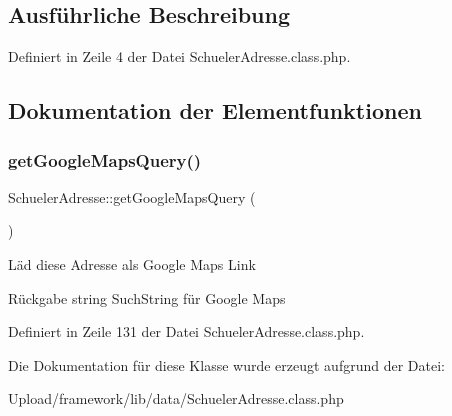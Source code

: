 \subsection{Ausführliche Beschreibung}


Definiert in Zeile 4 der Datei Schueler\+Adresse.\+class.\+php.



\subsection{Dokumentation der Elementfunktionen}
\mbox{\label{class_schueler_adresse_ad1d622017471861ae76e2079649db8f3}} 
\subsubsection{\texorpdfstring{get\+Google\+Maps\+Query()}{getGoogleMapsQuery()}}
{\footnotesize\ttfamily Schueler\+Adresse\+::get\+Google\+Maps\+Query (\begin{DoxyParamCaption}{ }\end{DoxyParamCaption})}

Läd diese Adresse als Google Maps Link \begin{DoxyReturn}{Rückgabe}
string Such\+String für Google Maps 
\end{DoxyReturn}


Definiert in Zeile 131 der Datei Schueler\+Adresse.\+class.\+php.



Die Dokumentation für diese Klasse wurde erzeugt aufgrund der Datei\+:\begin{DoxyCompactItemize}
\item 
Upload/framework/lib/data/Schueler\+Adresse.\+class.\+php\end{DoxyCompactItemize}
